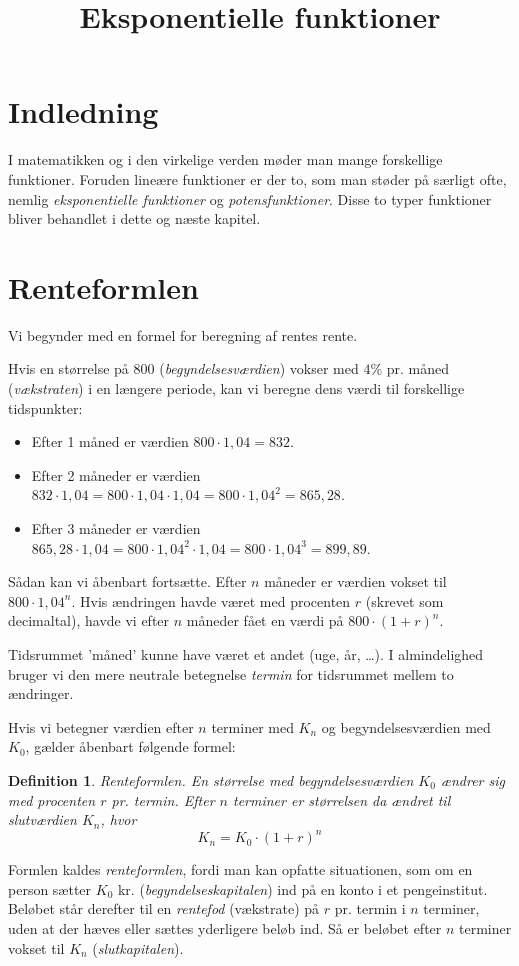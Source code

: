 \documentclass[12pt,oneside,a4paper]{article}
\title{Eksponentielle funktioner}
\newtheorem{mydef}[thm]{Definition}
\begin{document}

\section{Indledning}
I matematikken og i den virkelige verden møder man mange forskellige funktioner.
Foruden lineære funktioner er der to, som man støder på særligt ofte, nemlig
{\em eksponentielle funktioner} og {\em potensfunktioner}.
Disse to typer funktioner bliver behandlet i dette og næste kapitel.

\section{Renteformlen}
Vi begynder med en formel for beregning af rentes rente.

Hvis en størrelse på 800 ({\em begyndelsesværdien}) vokser med $4\%$ pr. måned
({\em vækst\-raten}) i en længere periode, kan vi beregne dens værdi til
forskellige tidspunkter:
\begin{itemize}
    \item Efter 1 måned er værdien $800\cdot 1,04 = 832$.
    \item Efter 2 måneder er værdien $832\cdot 1,04 = 800 \cdot 1,04 \cdot 1,04
        = 800 \cdot 1,04^2 = 865,28$.
    \item Efter 3 måneder er værdien $865,28\cdot 1,04 = 800 \cdot 1,04^2 \cdot
        1,04 = 800 \cdot 1,04^3 = 899,89$.
\end{itemize}
Sådan kan vi åbenbart fortsætte. Efter $n$ måneder er værdien vokset til
$800\cdot 1,04^n$. Hvis ændringen havde været med procenten $r$ (skrevet som
decimaltal), havde vi efter $n$ måneder fået en værdi på $800\cdot(1+r)^n$.

Tidsrummet 'måned' kunne have været et andet (uge, år, \ldots). I almindelighed
bruger vi den mere neutrale betegnelse {\em termin} for tidsrummet mellem to
ændringer.

Hvis vi betegner værdien efter $n$ terminer med $K_n$ og begyndelsesværdien med
$K_0$, gælder åbenbart følgende formel:
\begin{mydef}
    {\em Renteformlen}. En størrelse med begyndelsesværdien $K_0$ ændrer sig
    med procenten $r$ pr. termin. Efter $n$ terminer er størrelsen da ændret
    til slutværdien $K_n$, hvor
    $$
    K_n = K_0 \cdot (1+r)^n
    $$
\end{mydef}
Formlen kaldes {\em renteformlen}, fordi man kan opfatte situationen, som om en
person sætter $K_0$ kr. ({\em begyndelseskapitalen}) ind på en konto i et
penge\-institut. Beløbet står derefter til en {\em rentefod} (vækstrate) på $r$
pr. termin i $n$ terminer, uden at der hæves eller sættes yderligere beløb ind.
Så er beløbet efter $n$ terminer vokset til $K_n$ ({\em slutkapitalen}).
\end{document}
